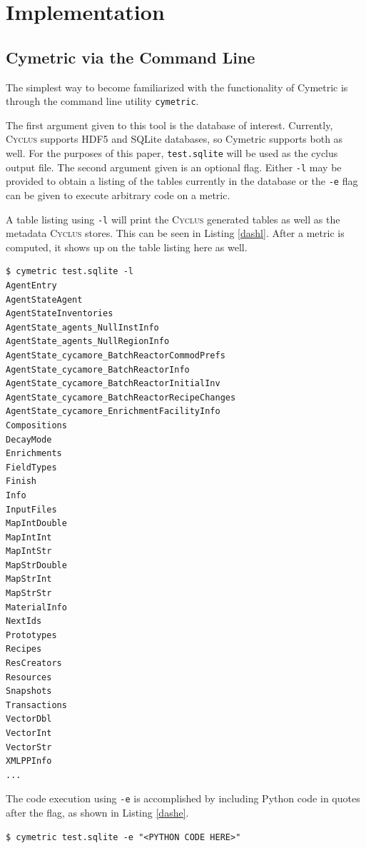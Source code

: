 \documentclass{anstrans}
\newcommand{\cyclus}{\textsc{Cyclus}\xspace}
\newcommand{\code}[1]{{\color{code}\texttt{#1}}}
\begin{document}
\section{Implementation}

\subsection{Cymetric via the Command Line}
The simplest way to become familiarized with the functionality of Cymetric 
is through the command line utility \code{cymetric}. 

The first argument given to this tool is the database of interest. 
Currently, \cyclus supports \gls{HDF5} \cite{folk2011overview} and \gls{SQLite} \cite{owens2006definitive} databases, 
so Cymetric supports both as well. For the purposes of this paper, 
\code{test.sqlite} will be used as the cyclus output file. The second 
argument given is an optional flag. Either \code{-l} may be provided to obtain 
a listing of the tables currently in the database or the \code{-e} flag 
can be given to execute arbitrary code on a metric. 

A table listing using \code{-l} will print the \cyclus generated tables 
as well as the metadata \cyclus stores. This can be seen in Listing 
\ref{dashl}. After a metric is computed, it shows up on the table 
listing here as well. 

\begin{lstlisting}[caption ={List of Tables in a Database}, label=dashl]
$ cymetric test.sqlite -l
AgentEntry
AgentStateAgent
AgentStateInventories
AgentState_agents_NullInstInfo
AgentState_agents_NullRegionInfo
AgentState_cycamore_BatchReactorCommodPrefs
AgentState_cycamore_BatchReactorInfo
AgentState_cycamore_BatchReactorInitialInv
AgentState_cycamore_BatchReactorRecipeChanges
AgentState_cycamore_EnrichmentFacilityInfo
Compositions
DecayMode
Enrichments
FieldTypes
Finish
Info
InputFiles
MapIntDouble
MapIntInt
MapIntStr
MapStrDouble
MapStrInt
MapStrStr
MaterialInfo
NextIds
Prototypes
Recipes
ResCreators
Resources
Snapshots
Transactions
VectorDbl
VectorInt
VectorStr
XMLPPInfo
...
\end{lstlisting} 

The code execution using \code{-e} is accomplished by including 
Python code in quotes after the flag, as shown in Listing \ref{dashe}. 

\begin{lstlisting}[caption ={Executing Code on a Database}, label=dashe]
$ cymetric test.sqlite -e "<PYTHON CODE HERE>"
\end{lstlisting} 
\end{document}
